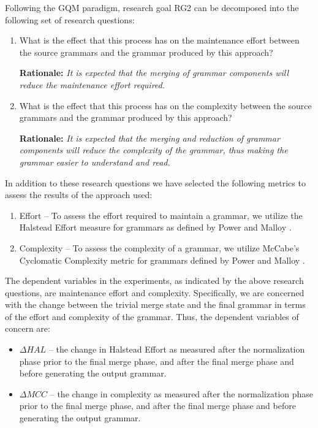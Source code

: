 \documentclass[10pt,nocc]{xrese_report}
\begin{document}
Following the GQM paradigm, research goal RG2 can be decomposed into the following set of research questions:

\begin{enumerate}[label={\textbf{RQ2.\arabic*}},left=.2in]
 \item What is the effect that this process has on the maintenance effort between the source grammars and the grammar produced by this approach?

 \textbf{Rationale:} \textit{It is expected that the merging of grammar components will reduce the maintenance effort required.}

 \item What is the effect that this process has on the complexity between the source grammars and the grammar produced by this approach?

 \textbf{Rationale:} \textit{It is expected that the merging and reduction of grammar components will reduce the complexity of the grammar, thus making the grammar easier to understand and read.}
\end{enumerate}

\noindent In addition to these research questions we have selected the following metrics to assess the results of the approach used:

\begin{enumerate}[label={\textbf{M2.\arabic*}},left=.2in]
  \item Effort -- To assess the effort required to maintain a grammar, we utilize the Halstead Effort measure for grammars as defined by Power and Malloy \cite{power_metrics_2004}.
  \item Complexity -- To assess the complexity of a grammar, we utilize McCabe's Cyclomatic Complexity metric for grammars defined by Power and Malloy \cite{power_metrics_2004}.
\end{enumerate}

The dependent variables in the experiments, as indicated by the above research questions, are maintenance effort and complexity. Specifically, we are concerned with the change between the trivial merge state and the final grammar in terms of the effort and complexity of the grammar. Thus, the dependent variables of concern are:

\begin{itemize}
\item $\Delta HAL$ -- the change in Halstead Effort as measured after the normalization phase prior to the final merge phase, and after the final merge phase and before generating the output grammar.
\item $\Delta MCC$ -- the change in complexity as measured after the normalization phase prior to the final merge phase, and after the final merge phase and before generating the output grammar.
\end{itemize}
\end{document}
